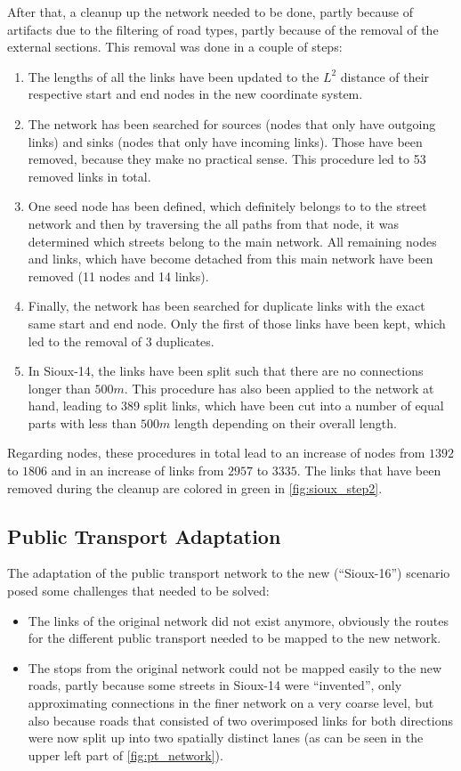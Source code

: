 After that, a cleanup up the network needed to be done, partly because of artifacts
due to the filtering of road types, partly because of the removal of the external
sections. This removal was done in a couple of steps:

\begin{enumerate}
\item The lengths of all the links have been updated to the $L^2$ distance of their
respective start and end nodes in the new coordinate system.
\item The network has been searched for sources (nodes that only have outgoing links)
and sinks (nodes that only have incoming links). Those have been removed, because they
make no practical sense. This procedure led to 53 removed links in total.
\item One seed node has been defined, which definitely belongs to to the street
network and then by traversing the all paths from that node, it was determined
which streets belong to the main network. All remaining nodes and links, which have
become detached from this main network have been removed (11 nodes and 14 links).
\item Finally, the network has been searched for duplicate links with the exact
same start and end node. Only the first of those links have been kept, which led
to the removal of 3 duplicates.
\item In Sioux-14, the links have been split such that there are no connections
longer than $500m$. This procedure has also been applied to the network at hand,
leading to 389 split links, which have been cut into a number of equal parts
with less than $500m$ length depending on their overall length.
\end{enumerate}

Regarding nodes, these procedures in total lead to an increase of nodes from
$1392$ to $1806$ and in an increase of links from $2957$ to $3335$. The links
that have been removed during the cleanup are colored in green in \cref{fig:sioux_step2}.

\subsection{Public Transport Adaptation}

The adaptation of the public transport network to the new (``Sioux-16'') scenario posed some
challenges that needed to be solved:

\begin{itemize}
\item The links of the original network did not exist anymore, obviously the
routes for the different public transport needed to be mapped to the new network.
\item The stops from the original network could not be mapped easily to the new
roads, partly because some streets in Sioux-14 were ``invented'', only approximating
connections in the finer network on a very coarse level, but also because roads
that consisted of two overimposed links for both directions were now split up into
two spatially distinct lanes (as can be seen in the upper left part of \cref{fig:pt_network}).
\end{itemize}


